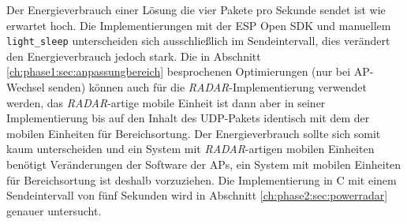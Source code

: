 Der Energieverbrauch einer Lösung die vier Pakete pro Sekunde sendet ist wie erwartet hoch.
Die Implementierungen mit der ESP Open SDK und manuellem \texttt{light\_sleep} unterscheiden sich ausschließlich im Sendeintervall, dies verändert den Energieverbrauch jedoch stark.
Die in Abschnitt \ref{ch:phase1:sec:anpassungbereich} besprochenen Optimierungen (nur bei AP-Wechsel senden) können auch für die \emph{RADAR}-Implementierung verwendet werden, das \emph{RADAR}-artige mobile Einheit ist dann aber in seiner Implementierung bis auf den Inhalt des UDP-Pakets identisch mit dem der mobilen Einheiten für Bereichsortung.
Der Energieverbrauch sollte sich somit kaum unterscheiden und ein System mit \emph{RADAR}-artigen mobilen Einheiten benötigt Veränderungen der Software der APs, ein System mit mobilen Einheiten für Bereichsortung ist deshalb vorzuziehen. 
Die Implementierung in C mit einem Sendeintervall von fünf Sekunden wird in Abschnitt \ref{ch:phase2:sec:powerradar} genauer untersucht.


